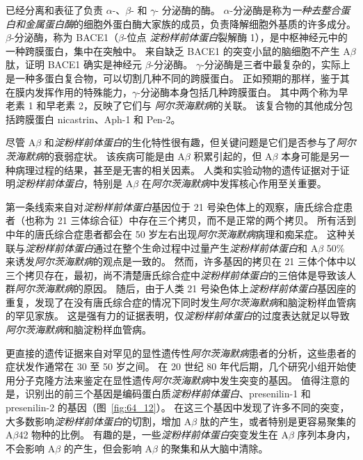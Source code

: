已经分离和表征了负责 $\alpha$-、$\beta$- 和 $\gamma$- 分泌酶的酶。
$\alpha$-分泌酶是称为\textit{一种去整合蛋白和金属蛋白酶}的细胞外蛋白酶大家族的成员，负责降解细胞外基质的许多成分。
$\beta$-分泌酶，称为 BACE1（$\beta$-位点 \textit{淀粉样前体蛋白}裂解酶 1），是中枢神经元中的一种跨膜蛋白，集中在突触中。
来自缺乏 BACE1 的突变小鼠的脑细胞不产生 A$\beta$ 肽，证明 BACE1 确实是神经元 $\beta$-分泌酶。
$\gamma$-分泌酶是三者中最复杂的，实际上是一种多蛋白复合物，可以切割几种不同的跨膜蛋白。
正如预期的那样，鉴于其在膜内发挥作用的特殊能力，$\gamma$-分泌酶本身包括几种跨膜蛋白。
其中两个称为早老素 1 和早老素 2，反映了它们与 \textit{阿尔茨海默病}的关联。
该复合物的其他成分包括跨膜蛋白 nicastrin、Aph-1 和 Pen-2。


尽管 A$\beta$ 和\textit{淀粉样前体蛋白}的生化特性很有趣，但关键问题是它们是否参与了\textit{阿尔茨海默病}的衰弱症状。
该疾病可能是由 A$\beta$ 积累引起的，但 A$\beta$ 本身可能是另一种病理过程的结果，甚至是无害的相关因素。
人类和实验动物的遗传证据对于证明\textit{淀粉样前体蛋白}，特别是 A$\beta$ 在\textit{阿尔茨海默病}中发挥核心作用至关重要。


第一条线索来自对\textit{淀粉样前体蛋白}基因位于 21 号染色体上的观察，唐氏综合症患者（也称为 21 三体综合征）中存在三个拷贝，而不是正常的两个拷贝。
所有活到中年的唐氏综合症患者都会在 50 岁左右出现\textit{阿尔茨海默病}病理和痴呆症。
这种关联与\textit{淀粉样前体蛋白}通过在整个生命过程中过量产生\textit{淀粉样前体蛋白}和 A$\beta$ 50\% 来诱发\textit{阿尔茨海默病}的观点是一致的。
然而，许多基因的拷贝在 21 三体个体中以三个拷贝存在，最初，尚不清楚唐氏综合症中\textit{淀粉样前体蛋白}的三倍体是导致该人群\textit{阿尔茨海默病}的原因。
随后，由于人类 21 号染色体上\textit{淀粉样前体蛋白}基因座的重复，发现了在没有唐氏综合症的情况下同时发生\textit{阿尔茨海默病}和脑淀粉样血管病的罕见家族。
这是强有力的证据表明，仅\textit{淀粉样前体蛋白}的过度表达就足以导致\textit{阿尔茨海默病}和脑淀粉样血管病。


更直接的遗传证据来自对罕见的显性遗传性\textit{阿尔茨海默病}患者的分析，这些患者的症状发作通常在 30 至 50 岁之间。
在 20 世纪 80 年代后期，几个研究小组开始使用分子克隆方法来鉴定在显性遗传\textit{阿尔茨海默病}中发生突变的基因。
值得注意的是，识别出的前三个基因是编码蛋白质\textit{淀粉样前体蛋白}、presenilin-1 和 presenilin-2 的基因（图~\ref{fig:64_12}）。
在这三个基因中发现了许多不同的突变，大多数影响\textit{淀粉样前体蛋白}的切割，增加 A$\beta$ 肽的产生，或者特别是更容易聚集的 A$\beta$42 物种的比例。
有趣的是，一些\textit{淀粉样前体蛋白}突变发生在 A$\beta$ 序列本身内，不会影响 A$\beta$ 的产生，但会影响 A$\beta$ 的聚集和从大脑中清除。


